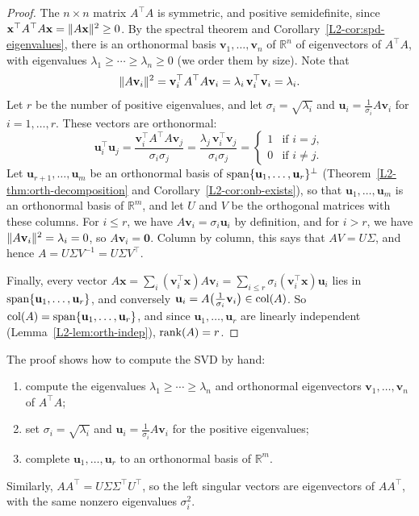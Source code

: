 \begin{proof}
    The $n \times n$ matrix $A^\top A$ is symmetric, and positive semidefinite, since $\mathbf{x}^\top A^\top A \mathbf{x} = \lVert A\mathbf{x} \rVert^2 \geq 0$. By the spectral theorem and Corollary~\ref{L2-cor:spd-eigenvalues}, there is an orthonormal basis $\mathbf{v}_1, \ldots, \mathbf{v}_n$ of $\mathbb{R}^n$ of eigenvectors of $A^\top A$, with eigenvalues $\lambda_1 \geq \cdots \geq \lambda_n \geq 0$ (we order them by size). Note that
    \[\lVert A\mathbf{v}_i \rVert^2 = \mathbf{v}_i^\top A^\top A \mathbf{v}_i = \lambda_i \, \mathbf{v}_i^\top \mathbf{v}_i = \lambda_i.\]
    Let $r$ be the number of positive eigenvalues, and let $\sigma_i = \sqrt{\lambda_i}$ and $\mathbf{u}_i = \frac{1}{\sigma_i} A \mathbf{v}_i$ for $i = 1, \ldots, r$. These vectors are orthonormal:
    \[\mathbf{u}_i^\top \mathbf{u}_j = \frac{\mathbf{v}_i^\top A^\top A \mathbf{v}_j}{\sigma_i \sigma_j} = \frac{\lambda_j\, \mathbf{v}_i^\top \mathbf{v}_j}{\sigma_i \sigma_j} = \begin{cases} 1 & \text{if } i = j, \\ 0 & \text{if } i \neq j. \end{cases}\]
    Let $\mathbf{u}_{r+1}, \ldots, \mathbf{u}_m$ be an orthonormal basis of $\operatorname{span}\{\mathbf{u}_1, \ldots, \mathbf{u}_r\}^\perp$ (Theorem~\ref{L2-thm:orth-decomposition} and Corollary~\ref{L2-cor:onb-exists}), so that $\mathbf{u}_1, \ldots, \mathbf{u}_m$ is an orthonormal basis of $\mathbb{R}^m$, and let $U$ and $V$ be the orthogonal matrices with these columns. For $i \leq r$, we have $A\mathbf{v}_i = \sigma_i \mathbf{u}_i$ by definition, and for $i > r$, we have $\lVert A\mathbf{v}_i \rVert^2 = \lambda_i = 0$, so $A\mathbf{v}_i = \mathbf{0}$. Column by column, this says that $AV = U\Sigma$, and hence $A = U\Sigma V^{-1} = U\Sigma V^\top$.

    Finally, every vector $A\mathbf{x} = \sum_i (\mathbf{v}_i^\top \mathbf{x}) A\mathbf{v}_i = \sum_{i \leq r} \sigma_i (\mathbf{v}_i^\top \mathbf{x}) \mathbf{u}_i$ lies in $\operatorname{span}\{\mathbf{u}_1, \ldots, \mathbf{u}_r\}$, and conversely $\mathbf{u}_i = A\big(\frac{1}{\sigma_i} \mathbf{v}_i\big) \in \operatorname{col}(A)$. So $\operatorname{col}(A) = \operatorname{span}\{\mathbf{u}_1, \ldots, \mathbf{u}_r\}$, and since $\mathbf{u}_1, \ldots, \mathbf{u}_r$ are linearly independent (Lemma~\ref{L2-lem:orth-indep}), $\operatorname{rank}(A) = r$.
\end{proof}

The proof shows how to compute the SVD by hand:
\begin{enumerate}
    \item compute the eigenvalues $\lambda_1 \geq \cdots \geq \lambda_n$ and orthonormal eigenvectors $\mathbf{v}_1, \ldots, \mathbf{v}_n$ of $A^\top A$;
    \item set $\sigma_i = \sqrt{\lambda_i}$ and $\mathbf{u}_i = \frac{1}{\sigma_i} A \mathbf{v}_i$ for the positive eigenvalues;
    \item complete $\mathbf{u}_1, \ldots, \mathbf{u}_r$ to an orthonormal basis of $\mathbb{R}^m$.
\end{enumerate}
Similarly, $AA^\top = U \Sigma\Sigma^\top U^\top$, so the left singular vectors are eigenvectors of $AA^\top$, with the same nonzero eigenvalues $\sigma_i^2$.

